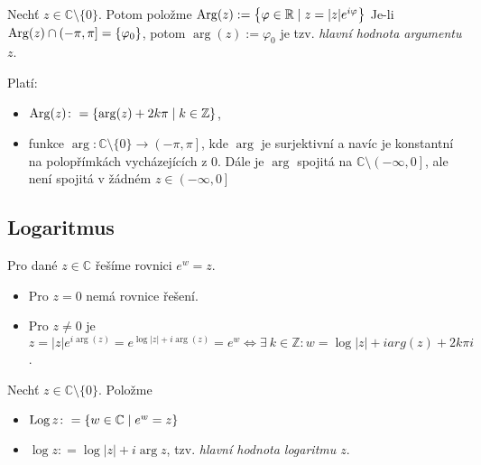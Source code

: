     \begin{notation}
          Nechť $z\in\mathbb{C}\setminus\{0\}$. Potom položme $\operatorname*{Arg}(z):=\left\{\varphi\in\mathbb{R}\mid z=\lvert z \rvert e^{i\varphi}\right\}$ Je-li $\operatorname*{Arg}(z) \cap  (-\pi,\pi]=\{\varphi_0\}$, potom $\arg(z):=\varphi_0$ je tzv. \emph{hlavní hodnota argumentu $z$}. %
    \end{notation}
     
         Platí: 
        \begin{itemize}
            \item $\operatorname*{Arg}(z)\colon = \{\arg(z)+2k\pi\mid k\in\mathbb{Z}\}$,
            \item funkce $\arg\colon \mathbb {C}\setminus\{0\} \to \left (-\pi,\pi\right ]$, kde $\arg$ je surjektivní a navíc je konstantní na polopřímkách vycházejících z $0$. Dále je $\arg$ spojitá na $\mathbb {C}\setminus\left (-\infty,0\right ]$, ale není spojitá v žádném $z\in \left (-\infty,0\right ]$
        \end{itemize}



\subsection{Logaritmus}
Pro dané $z\in\mathbb{C}$ řešíme rovnici $e^w=z$. 
\begin{itemize}
    \item Pro $z=0$ nemá rovnice řešení. \item Pro $z\neq 0$ je $z=\lvert z \rvert e^{i  \arg(z)}=e^{\log\lvert z \rvert+i   \arg(z)}=e^w\iff\exists\ k \in\mathbb{Z}\colon w=\log \lvert z \rvert +i arg(z)+2k\pi i$.
    \end{itemize}

\begin{definition}
Nechť $z\in\mathbb{C}\setminus\{0\}$. Položme 
\begin{itemize}
    \item $\operatorname*{Log} z\colon=\{w\in\mathbb{C}\mid e^w=z\}$
    \item $\log z\colon= \log\lvert z \rvert + i \arg z$,  tzv. \emph{hlavní hodnota logaritmu $z$}.
\end{itemize}
\end{definition}

